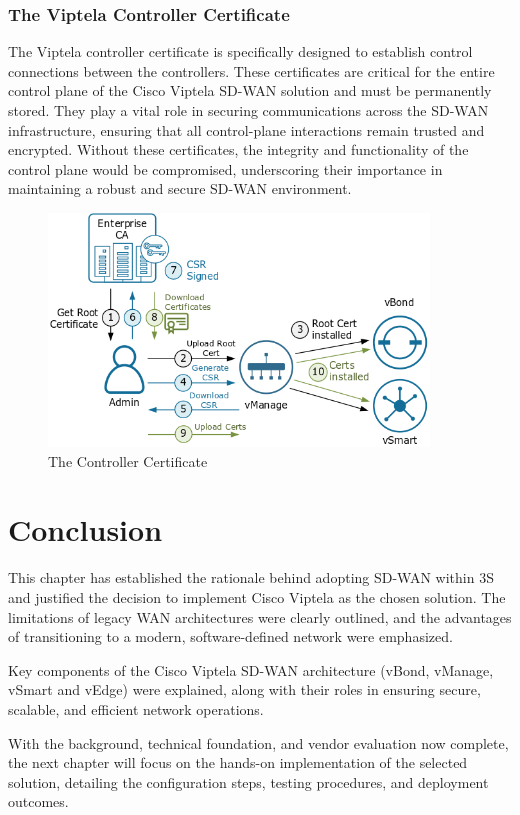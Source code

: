 \documentclass[12pt,english]{report}
\begin{document}
\subsubsection{The Viptela Controller Certificate}
The Viptela controller certificate is specifically designed to establish control connections between the controllers. These certificates are critical for the entire control plane of the Cisco Viptela SD-WAN solution and must be permanently stored. They play a vital role in securing communications across the SD-WAN infrastructure, ensuring that all control-plane interactions remain trusted and encrypted. Without these certificates, the integrity and functionality of the control plane would be compromised, underscoring their importance in maintaining a robust and secure SD-WAN environment\cite{ref16}.
\begin{figure}[H]
    \centering
    \includegraphics[width= 0.9\textwidth]{chapter1/certification.png}
    \caption{The Controller Certificate\cite{ref16}}
    \label{fig: The Controller Certificate}
\end{figure}
\section{Conclusion}
This chapter has established the rationale behind adopting SD-WAN within 3S and justified the decision to implement Cisco Viptela as the chosen solution. The limitations of legacy WAN architectures were clearly outlined, and the advantages of transitioning to a modern, software-defined network were emphasized.

Key components of the Cisco Viptela SD-WAN architecture (vBond, vManage, vSmart and vEdge) were explained, along with their roles in ensuring secure, scalable, and efficient network operations.

With the background, technical foundation, and vendor evaluation now complete, the next chapter will focus on the hands-on implementation of the selected solution, detailing the configuration steps, testing procedures, and deployment outcomes.
\end{document}
